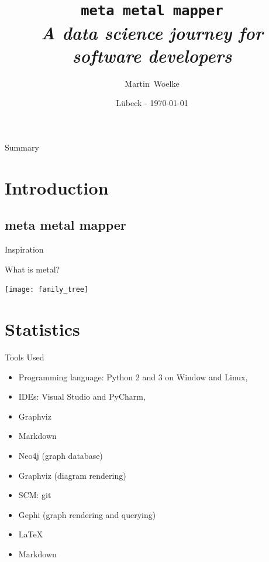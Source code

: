 \documentclass{beamer}
\title[Titel]
{
  \texttt{\huge{meta metal mapper}}\\\vspace{3 mm}
  \textit{A data science journey for software developers}
}
\author[Martin Woelke]
{
  Martin~Woelke
}
\date{Lübeck - \today}
\begin{document}
\begin{frame}
  \titlepage
\end{frame}

\begin{frame}{Summary}
  \tableofcontents
\end{frame}


\section{Introduction}


  \subsection{meta metal mapper}

    \begin{frame}{Inspiration}
    \end{frame}

    \begin{frame}{What is metal?}
      \begin{center}
        \texttt{[image: family\_tree]}
      \end{center}
    \end{frame}

  \section{Statistics}

    \begin{frame}{Tools Used}
      \begin{itemize}
        \item<1-> Programming language: Python 2 and 3 on Window and Linux,
        \item<1-> IDEs: Visual Studio and PyCharm,
        \item<1-> Graphviz
        \item<1-> Markdown
        \item<1-> Neo4j (graph database)
        \item<1-> Graphviz (diagram rendering)
        \item<1-> SCM: git
        \item<1-> Gephi (graph rendering and querying)
        \item<1-> \LaTeX{}
        \item<1-> Markdown
      \end{itemize}
    \end{frame}
\end{document}
